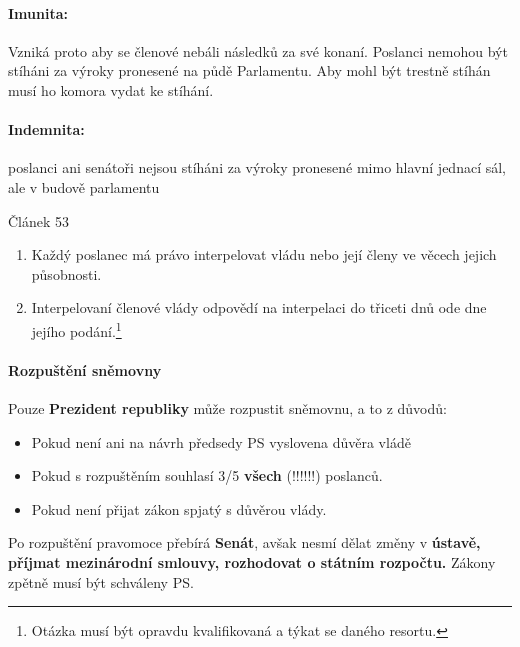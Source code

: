 \documentclass[10pt,a4paper,
twoside,%
]{report}
\newcommand{\ust}[1]{\begin{footnotesize}%
\begin{center}
Článek #1
\end{center}
\end{footnotesize}}%
\begin{document}
\paragraph{Imunita:} Vzniká proto aby se členové nebáli následků za své konaní. Poslanci nemohou být stíháni za výroky pronesené na půdě Parlamentu. Aby mohl být trestně stíhán musí ho komora vydat ke stíhání.

\paragraph{Indemnita:}poslanci ani senátoři nejsou stíháni za výroky pronesené mimo hlavní jednací sál, ale v budově parlamentu

\ust{53}{\begin{enumerate}
\item Každý poslanec má právo interpelovat vládu nebo její členy ve věcech jejich působnosti.
\item Interpelovaní členové vlády odpovědí na interpelaci do třiceti dnů ode dne jejího podání.\footnote{ Otázka musí být opravdu kvalifikovaná a týkat se daného resortu.}
\end{enumerate}}

\paragraph{Rozpuštění sněmovny} Pouze \textbf{Prezident republiky} může rozpustit sněmovnu, a to z důvodů:
\begin{itemize}
\item Pokud není ani na návrh předsedy PS vyslovena důvěra vládě
\item Pokud s rozpuštěním souhlasí 3/5 \textbf{všech} (!!!!!!) poslanců.
\item Pokud není přijat zákon spjatý s důvěrou vlády. 
\end{itemize}
Po rozpuštění pravomoce přebírá \textbf{Senát}, avšak nesmí dělat změny v \textbf{ústavě, příjmat mezinárodní  smlouvy, rozhodovat o státním rozpočtu.} Zákony zpětně musí být schváleny PS.
\end{document}
